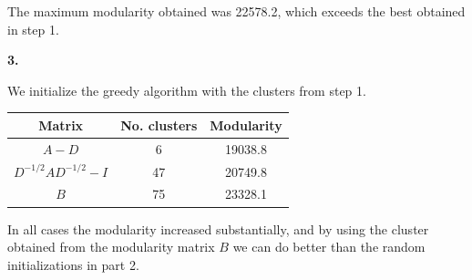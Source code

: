 \documentclass[11pt]{article}
\begin{document}
The maximum modularity obtained was 22578.2, which exceeds the best obtained in step 1.

\noindent\textbf{3.}

We initialize the greedy algorithm with the clusters from step 1.

\begin{tabular}{c|c|c}
Matrix & No. clusters & Modularity \\ \hline
$A - D$ & 6 & 19038.8\\
$D^{-1/2}AD^{-1/2}-I$ & 47 & 20749.8\\
$B$ & 75 & 23328.1
\end{tabular}

In all cases the modularity increased substantially, and by using the cluster obtained from the modularity matrix $B$ we can do better than the random initializations in part 2.
\end{document}

